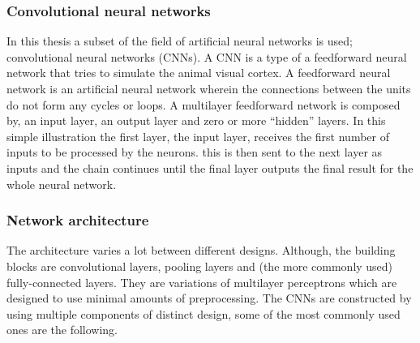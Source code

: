 \subsubsection{Convolutional neural networks}

In this thesis a subset of the field of artificial neural networks is used; convolutional neural networks (CNNs). A CNN is a type of a feedforward neural network  that tries to simulate the animal visual cortex. A feedforward neural network is an artificial neural network wherein the connections between the units do not form any cycles or loops. A multilayer feedforward network is composed by, an input layer, an output layer and zero or more ``hidden'' layers. In this simple illustration the first layer, the input layer, receives the first number of inputs to be processed by the neurons. this is then sent to the next layer as inputs and the chain continues until the final layer outputs the final result for the whole neural network. 

\subsubsection{Network architecture}
The architecture varies a lot between different designs. Although, the building blocks are convolutional layers, pooling layers and (the more commonly used) fully-connected layers. They are variations of multilayer perceptrons which are designed to use minimal amounts of preprocessing. The CNNs are constructed by using multiple components of distinct design, some of the most commonly used ones are the following. \\

